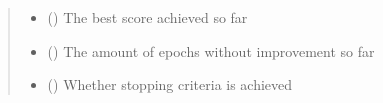 \documentclass[letterpaper,10pt,english]{sphinxmanual}
\begin{document}
\begin{fulllineitems}
\begin{quote}
\begin{description}
\begin{itemize}
\item {} 
 () \textendash{} The best score achieved so far

\item {} 
 () \textendash{} The amount of epochs without improvement so far

\item {} 
 () \textendash{} Whether stopping criteria is achieved

\end{itemize}

\end{description}\end{quote}

\end{fulllineitems}

\end{document}
